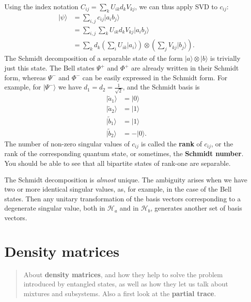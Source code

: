 \documentclass[fleqn]{article}
\let\oldsection\section
\renewcommand\section{\clearpage\oldsection}
\begin{document}
Using the index notation \(C_{ij} = \sum_k U_{ik}d_k V_{kj}\), we can thus apply SVD to \(c_{ij}\):
\[
  \begin{aligned}
    |\psi\rangle
    &= \sum_{i,j} c_{ij}|a_ib_j\rangle
  \\&= \sum_{i,j} \sum_k U_{ik}d_k V_{kj}|a_ib_j\rangle
  \\&= \sum_k d_k \left(\sum_i U_{ik}|a_i\rangle\right)\otimes\left(\sum_j V_{kj}|b_j\rangle\right).
  \end{aligned}
\]
The Schmidt decomposition of a separable state of the form
\(|a\rangle\otimes|b\rangle\) is trivially just this state.
The Bell states \(\Psi^+\) and \(\Phi^+\) are already written in their Schmidt form, whereas \(\Psi^-\) and \(\Phi^-\) can be easily expressed in the Schmidt form.
For example, for \(|\Psi^-\rangle\) we have \(d_1 = d_2 = \frac{1}{\sqrt{2}}\), and the Schmidt basis is
\[
  \begin{aligned}
    |\tilde{a}_1\rangle &= |0\rangle
  \\|\tilde{a}_2\rangle &= |1\rangle
  \\|\tilde{b}_1\rangle &= |1\rangle
  \\|\tilde{b}_2\rangle &= -|0\rangle.
  \end{aligned}
\]
The number of non-zero singular values of \(c_{ij}\) is called the \textbf{rank} of \(c_{ij}\), or the rank of the corresponding quantum state, or sometimes, the \textbf{Schmidt number}.
You should be able to see that all bipartite states of rank-one are separable.

The Schmidt decomposition is \emph{almost} unique.
The ambiguity arises when we have two or more identical singular values, as, for example, in the case of the Bell states.
Then any unitary transformation of the basis vectors corresponding to a degenerate singular value, both in \(\mathcal{H}_a\) and in \(\mathcal{H}_b\), generates another set of basis vectors.

\hypertarget{density-matrices}{%
\section{Density matrices}\label{density-matrices}}

\begin{quote}
About \textbf{density matrices}, and how they help to solve the problem introduced by entangled states, as well as how they let us talk about mixtures and subsystems.
Also a first look at the \textbf{partial trace}.
\end{quote}
\end{document}
